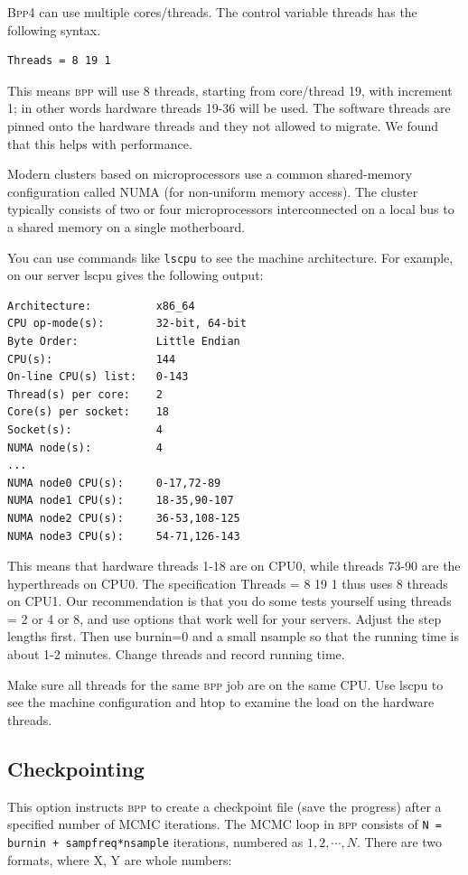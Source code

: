 \documentclass[a4paper]{book}
\numberwithin{equation}{section} \renewcommand{\baselinestretch}{0.55}
\begin{document}
\textsc{Bpp4} can use multiple cores/threads.  The control variable
threads has the following syntax.
\begin{verbatim}
Threads = 8 19 1
\end{verbatim}
This means \textsc{bpp} will use 8 threads, starting from core/thread
19, with increment 1; in other words hardware threads 19-36 will be
used.  The software threads are pinned onto the hardware threads and
they not allowed to migrate.  We found that this helps with
performance.

Modern clusters based on microprocessors use a common shared-memory
configuration called NUMA (for non-uniform memory access).  The
cluster typically consists of two or four microprocessors
interconnected on a local bus to a shared memory on a single
motherboard.

You can use commands like \texttt{lscpu} to see the machine
architecture.  For example, on our server lscpu gives the following
output:

\begin{verbatim}
Architecture:          x86_64
CPU op-mode(s):        32-bit, 64-bit
Byte Order:            Little Endian
CPU(s):                144
On-line CPU(s) list:   0-143
Thread(s) per core:    2
Core(s) per socket:    18
Socket(s):             4
NUMA node(s):          4
...
NUMA node0 CPU(s):     0-17,72-89
NUMA node1 CPU(s):     18-35,90-107
NUMA node2 CPU(s):     36-53,108-125
NUMA node3 CPU(s):     54-71,126-143
\end{verbatim}
This means that hardware threads 1-18 are on CPU0, while threads 73-90
are the hyperthreads on CPU0.  The specification Threads = 8 19 1 thus
uses 8 threads on CPU1.  Our recommendation is that you do some tests
yourself using threads = 2 or 4 or 8, and use options that work well
for your servers.  Adjust the step lengths first.  Then use burnin=0
and a small nsample so that the running time is about 1-2 minutes.
Change threads and record running time.

Make sure all threads for the same \textsc{bpp} job are on the same
CPU.  Use lscpu to see the machine configuration and htop to examine
the load on the hardware threads.


\subsection{Checkpointing}

This option instructs \textsc{bpp} to create a checkpoint file (save
the progress) after a specified number of MCMC iterations.  The MCMC
loop in \textsc{bpp} consists of \texttt{N = burnin +
  sampfreq*nsample} iterations, numbered as $1,2,\cdots,N$.  There are
two formats, where X, Y are whole numbers:
\end{document}
